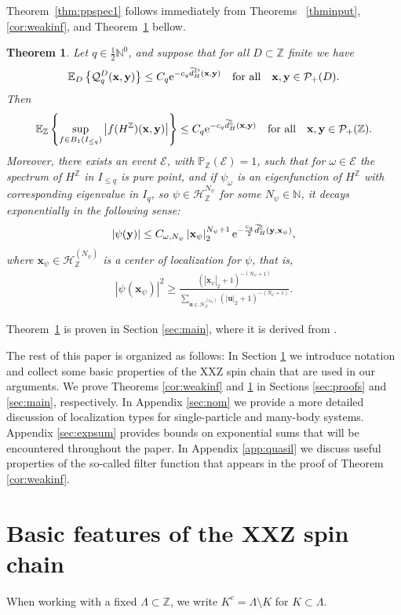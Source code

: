 \documentclass[12pt, a4paper,reqno]{amsart}
\numberwithin{equation}{section}
\newtheorem{theorem}{Theorem}[section]
\newcommand\N{\mathbb N}
\newcommand\Z{\mathbb Z}
\newcommand\x{\mathbf{x}}
\newcommand\y{\mathbf{y}}
\renewcommand\u{\mathbf{u}}
\newcommand\e{\mathrm{e}}
\renewcommand\P{\mathbb P}
\newcommand\E{\mathbb E}
\newcommand\cE{\mathcal{E}}
\newcommand\cH{\mathcal{H}}
\newcommand\cQ{\mathcal{Q}}
\newcommand\cP{\mathcal{P}}
\newcommand\wtilde{\widetilde}
\newcommand\be{\begin{equation}\begin{aligned}}
\newcommand\ee{\end{aligned}\end{equation}}
\newcommand{\abs}[1]{\left\lvert #1 \right\rvert}
\newcommand{\set}[1]{\left\{ #1 \right\}}
\newcommand{\pa}[1]{\left( #1 \right)}
\newcommand\La{\Lambda}
\newcommand{\up}[1]{^{\left(#1\right)}}
\newcommand{\qtx}[1]{\quad\text{#1}\quad}
\begin{document}
Theorem~\ref{thm:ppspec1} follows immediately from Theorems~ \ref{thminput}, \ref{cor:weakinf}, and Theorem~\ref{thmdynloc} bellow.
\begin{theorem}\label{thmdynloc}
Let $q\in \frac 12 \N^0$, and suppose that for all $D\subset \Z$ finite  we have
 \be %
\E_{D}\set{\cQ_q^D ({\bf x},{\bf y})}\le  C_q \e^{-c_q \wtilde d_{H}^D({\bf x},{\bf y})}  \qtx{for all}\x,\y\in \cP_{+}(D).
\ee  
Then 
\be
\E_\Z \set{\sup_{f\in B_1(I_{\le q})}\abs{f(H^\Z) ({\bf x},{\bf y})} }\le  C_q \e^{-c_q \wtilde d_{H}^\Z({\bf x},{\bf y})} \qtx{for all}\x,\y\in \cP_{+}(\Z).
\ee
Moreover, there exists an event $\cE$, with $\P_\Z(\cE)=1$, such that for $\omega \in \cE$  the spectrum of $H^\Z$ in $I_{\le q}$ is pure point, and if $\psi_\omega$ is an eigenfunction of $H^\Z$ with corresponding eigenvalue  in  $I_{q}$, so $\psi \in \cH_\Z^{N_\psi}$ for some $N_\psi \in \N$,  it decays exponentially   in the following sense:   
\be
\abs{\psi(\y)} \le C_{\omega,N_\psi}   \abs{\x_{\psi}}_2^{N_\psi +1}\e^{-\frac {c_q}2 \wtilde d_{H}^\Z({\bf y},\x_{\psi})}, 
\ee
where $\x_{\psi}\in \cH_\Z\up{N_\psi}$ is a center of localization for $\psi$, that is,
\be
\abs{\psi(\x_{\psi})}^2 \ge
  \frac {\pa{\abs{\x_{\psi}}_2+1}^{-\pa{N_\psi+1}}}{\sum_{\u \in \cH_\Z^{(\N_\psi)}     }          \pa{    \abs{\u}_2+1}^{-\pa{N_\psi +1}}}.
\ee
\end{theorem}
Theorem~\ref{thmdynloc} is proven in Section \ref{sec:main}, where it is derived from \cite[Theorem 4.1]{AW2}.



The rest of this paper is organized as follows: In Section \ref{sec:feat} we introduce notation and collect some basic properties of the XXZ spin chain that are used in our arguments. 
We prove Theorems \ref{cor:weakinf} and \ref{thmdynloc}  in Sections \ref{sec:proofs} and \ref{sec:main}, respectively. In Appendix \ref{sec:nom} we provide a more detailed discussion of localization types for single-particle and many-body systems.  
Appendix \ref{sec:expsum} provides bounds on exponential sums that will be encountered throughout the paper. In Appendix \ref{app:quasil} we discuss useful properties of the so-called filter function that  appears in the proof of  Theorem \ref{cor:weakinf}.


\section{Basic features of the XXZ spin chain}\label{sec:feat}
When working  with a fixed  $\La \subset \Z$, we write $K^c=\La\setminus K$ for $K\subset \La$.
 
\end{document}
